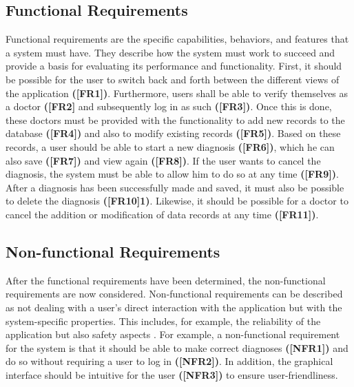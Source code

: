 \subsection{Functional Requirements}
Functional requirements are the specific capabilities, behaviors, and features that a system must have. They describe how the system must work to succeed and provide a basis for evaluating its performance and functionality. First, it should be possible for the user to switch back and forth between the different views of the application \textbf{([FR1])}. Furthermore, users shall be able to verify themselves as a doctor \textbf{([FR2]} and subsequently log in as such \textbf{([FR3])}. Once this is done, these doctors must be provided with the functionality to add new records to the database \textbf{([FR4])} and also to modify existing records \textbf{([FR5])}. Based on these records, a user should be able to start a new diagnosis \textbf{([FR6])}, which he can also save \textbf{([FR7])} and view again \textbf{([FR8])}. If the user wants to cancel the diagnosis, the system must be able to allow him to do so at any time \textbf{([FR9])}. After a diagnosis has been successfully made and saved, it must also be possible to delete the diagnosis \textbf{([FR10]1)}. Likewise, it should be possible for a doctor to cancel the addition or modification of data records at any time \textbf{([FR11])}. 


\subsection{Non-functional Requirements}
After the functional requirements have been determined, the non-functional requirements are now considered. Non-functional requirements can be described as not dealing with a user's direct interaction with the application but with the system-specific properties. This includes, for example, the reliability of the application but also safety aspects \cite{.req2}. For example, a non-functional requirement for the system is that it should be able to make correct diagnoses \textbf{([NFR1])} and do so without requiring a user to log in \textbf{([NFR2])}. In addition, the graphical interface should be intuitive for the user \textbf{([NFR3])} to ensure user-friendliness.



